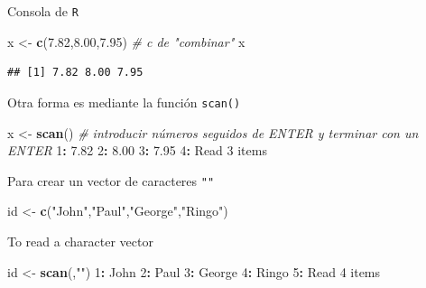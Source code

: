 \documentclass[]{book}
\newenvironment{Shaded}{\begin{snugshade}}{\end{snugshade}}
\newcommand{\KeywordTok}[1]{\textcolor[rgb]{0.13,0.29,0.53}{\textbf{#1}}}
\newcommand{\DecValTok}[1]{\textcolor[rgb]{0.00,0.00,0.81}{#1}}
\newcommand{\FloatTok}[1]{\textcolor[rgb]{0.00,0.00,0.81}{#1}}
\newcommand{\StringTok}[1]{\textcolor[rgb]{0.31,0.60,0.02}{#1}}
\newcommand{\CommentTok}[1]{\textcolor[rgb]{0.56,0.35,0.01}{\textit{#1}}}
\newcommand{\OperatorTok}[1]{\textcolor[rgb]{0.81,0.36,0.00}{\textbf{#1}}}
\newcommand{\NormalTok}[1]{#1}
\begin{document}
Consola de \texttt{R}

\begin{Shaded}
\begin{Highlighting}[]
\NormalTok{x <-}\StringTok{ }\KeywordTok{c}\NormalTok{(}\FloatTok{7.82}\NormalTok{,}\FloatTok{8.00}\NormalTok{,}\FloatTok{7.95}\NormalTok{) }\CommentTok{# c de "combinar"}
\NormalTok{x}
\end{Highlighting}
\end{Shaded}

\begin{verbatim}
## [1] 7.82 8.00 7.95
\end{verbatim}

Otra forma es mediante la función \texttt{scan()}

\begin{Shaded}
\begin{Highlighting}[]
\NormalTok{x <-}\StringTok{ }\KeywordTok{scan}\NormalTok{()  }\CommentTok{# introducir números seguidos de ENTER y terminar con un ENTER}
\DecValTok{1}\OperatorTok{:}\StringTok{ }\FloatTok{7.82}
\DecValTok{2}\OperatorTok{:}\StringTok{ }\FloatTok{8.00}
\DecValTok{3}\OperatorTok{:}\StringTok{ }\FloatTok{7.95}
\DecValTok{4}\OperatorTok{:}\StringTok{ }
\NormalTok{Read }\DecValTok{3}\NormalTok{ items}
\end{Highlighting}
\end{Shaded}

Para crear un vector de caracteres \texttt{""}

\begin{Shaded}
\begin{Highlighting}[]
\NormalTok{id <-}\StringTok{ }\KeywordTok{c}\NormalTok{(}\StringTok{"John"}\NormalTok{,}\StringTok{"Paul"}\NormalTok{,}\StringTok{"George"}\NormalTok{,}\StringTok{"Ringo"}\NormalTok{)}
\end{Highlighting}
\end{Shaded}

To read a character vector

\begin{Shaded}
\begin{Highlighting}[]
\NormalTok{id <-}\StringTok{ }\KeywordTok{scan}\NormalTok{(,}\StringTok{""}\NormalTok{)}
\DecValTok{1}\OperatorTok{:}\StringTok{ }\NormalTok{John}
\DecValTok{2}\OperatorTok{:}\StringTok{ }\NormalTok{Paul}
\DecValTok{3}\OperatorTok{:}\StringTok{ }\NormalTok{George}
\DecValTok{4}\OperatorTok{:}\StringTok{ }\NormalTok{Ringo}
\DecValTok{5}\OperatorTok{:}\StringTok{ }
\NormalTok{Read }\DecValTok{4}\NormalTok{ items  }
\end{Highlighting}
\end{Shaded}
\end{document}
